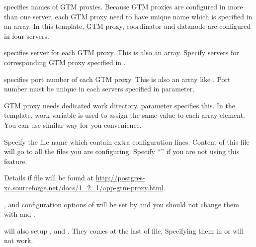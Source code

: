   
       specifies names of GTM proxies.
      Because GTM proxies are configured in more than one server, each GTM proxy need to have
	  unique name which is specified in an array.
      In this template, GTM proxy, coordinator and datanode are configured in four servers.
  
  
       specifies server for each GTM proxy.
      This is also an array.
      Specify servers for corresponding GTM proxy specified in .
  
  
       specifies port number of each GTM proxy.
      This is also an array like .
      Port number must be unique in each servers specified in  parameter.
  
  
      GTM proxy needs dedicated work directory.
       parameter specifies this.
      In the template, work variable  is used to assign the same value to each
	  array element.
      You can use similar way for you convenience.
  
  
      Specify the file name which contain extra  configuration lines.
      Content of this file will go to all the  files you are configuring.
      Specify ``'' if you are not using this feature.
      
      Details if  file will be found at
	  \url{http://postgres-xc.sourceforge.net/docs/1_2_1/app-gtm-proxy.html}.
      
      ,
	   and 
	  configuration options of  
      will be set by  and you should not change them with
	   and .
      
       will also setup  , 
	  and .
      They comes at the last of  file.
      Specifying them in  or  will
	  not work.
  
